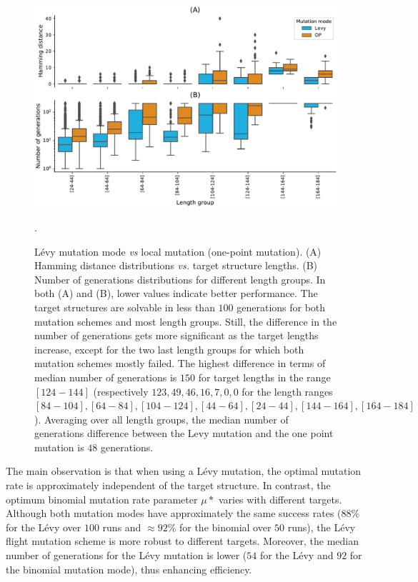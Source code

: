 \begin{figure}[t!]
	\centering
	\includegraphics[width=1. \linewidth]{../res/images/arnaque/pkbase_ipknotV2.pdf}
	\caption{Lévy mutation mode \emph{vs} local mutation (one-point mutation). (A) Hamming distance distributions \emph{vs.} target structure lengths. (B)  Number of generations distributions for different length groups. In both (A) and (B), lower values indicate better performance. The target structures are solvable in less than $100$ generations for both mutation schemes and most length groups. Still, the difference in the number of generations gets more significant as the target lengths increase, except for the two last length groups for which both mutation schemes mostly failed. The highest difference in terms of median number of generations is $150$ for target lengths in the range $[124-144]$ (respectively $123, 49, 46, 16, 7, 0, 0$ for the length ranges $[84-104], [64-84], [104-124], [44-64], [24-44], [144-164], [164-184]$). Averaging over all length groups, the median number of generations difference between the Levy mutation and the one point mutation is $48$ generations. }\label{Fig:OP_vs_aRNAque}
	\medskip
	\small.
\end{figure}
The main observation is that when using a Lévy mutation, the optimal mutation rate is approximately independent of the target structure. In contrast, the optimum binomial mutation rate parameter $\mu*$ varies with different targets. Although both mutation modes have approximately the same success rates ($88\%$ for the Lévy over $100$ runs and $\approx 92\%$ for the binomial over $50$ runs), the Lévy flight mutation scheme is more robust to different targets. Moreover, the median number of generations for the Lévy mutation is lower ($54$ for the Lévy and $92$ for the binomial mutation mode), thus enhancing efficiency.


